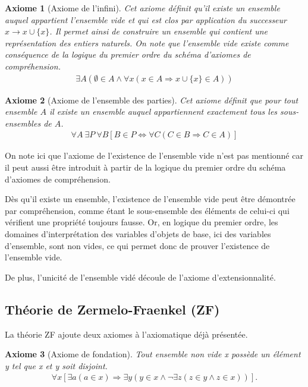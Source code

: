 \documentclass[10pt,a4paper]{article}
\newtheorem{axiom}{Axiome}[section]
\begin{document}
\begin{axiom}[Axiome de l'infini] Cet axiome définit qu'il existe un ensemble auquel appartient l'ensemble vide et qui est clos par application du successeur$ x \rightarrow x \cup \{x\}$. Il permet ainsi de construire un ensemble qui contient une représentation des entiers naturels. On note que l'ensemble vide existe comme conséquence de la logique du premier ordre du schéma d'axiomes de compréhension.
\begin{align}
\exists A \left( \emptyset \in A \land \forall x (x \in A \Rightarrow x \cup \{x\} \in A) \right) 
\end{align}
\end{axiom}

\begin{axiom}[Axiome de l'ensemble des parties] Cet axiome définit que pour tout ensemble $A$ il existe un ensemble auquel appartiennent exactement tous les sous-ensembles de $A$.
\begin{align}
\forall A \ \exists P \ \forall B \left[B \in P \Leftrightarrow \forall C \left( C \in B \Rightarrow C \in A \right) \right] 
\end{align}
\end{axiom}

On note ici que l'axiome de l'existence de l'ensemble vide n'est pas mentionné car il peut aussi être introduit à partir de la logique du premier ordre du schéma d'axiomes de compréhension.

Dès qu'il existe un ensemble, l'existence de l'ensemble vide peut être démontrée par compréhension, comme étant le sous-ensemble des éléments de celui-ci qui vérifient une propriété toujours fausse.
Or, en logique du premier ordre, les domaines d'interprétation des variables d'objets de base, ici des variables d'ensemble, sont non vides, ce qui permet donc de prouver l'existence de l'ensemble vide.

De plus, l'unicité de l'ensemble vidé découle de l'axiome d'extensionnalité.

\subsection{Théorie de Zermelo-Fraenkel (ZF)}

La théorie ZF ajoute deux axiomes à l'axiomatique déjà présentée.

\begin{axiom}[Axiome de fondation] Tout ensemble non vide x possède un élément y tel que x et y soit disjoint.
\begin{align}
\forall x [ \exists a ( a \in x) \Rightarrow \exists y ( y \in x \land \lnot \exists z (z \in y \land z \in x))]. 
\end{align}
\end{axiom}
\end{document}
